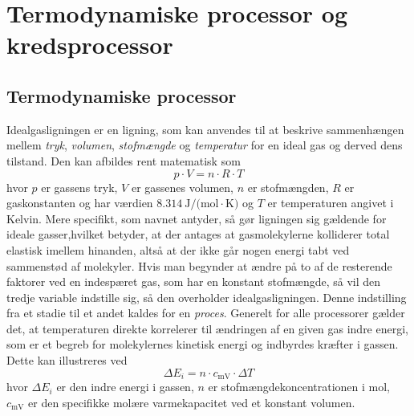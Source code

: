 \documentclass[12pt,a4paper]{article}
\author{Christian Kaae Larsen}
\begin{document}
	\tableofcontents
	\section{Termodynamiske processor og kredsprocessor}
		\subsection{Termodynamiske processor}
			Idealgasligningen er en ligning, som kan anvendes til at beskrive sammenhængen mellem
			\textit{tryk}, \textit{volumen}, \textit{stofmængde} og \textit{temperatur} for en ideal 
			gas og derved dens tilstand. Den kan afbildes rent matematisk som
			\begin{equation}
				p \cdot V = n \cdot R \cdot T
			\end{equation}
			hvor \(p\) er gassens tryk, \(V\) er gassenes volumen, \(n\) er stofmængden, \(R\) er gaskonstanten
			og har værdien \(\SI{8.314}{\joule\per (\mole\cdot\kelvin)} \) og \(T\) er temperaturen angivet i 
			Kelvin. Mere specifikt, som navnet antyder, så gør ligningen sig 
			gældende for ideale gasser,hvilket betyder, at der antages at gasmolekylerne kolliderer 
			total elastisk imellem hinanden, altså at der ikke går nogen energi tabt ved sammenstød af 
			molekyler. Hvis man begynder at ændre på to af de resterende faktorer ved en indespæret gas, 
			som har en konstant stofmængde, så vil den tredje variable indstille sig, så den overholder
			idealgasligningen. Denne indstilling fra et stadie til et andet kaldes for en \textit{proces}. 
			Generelt for alle processorer gælder det, at temperaturen direkte korrelerer til ændringen af 
			en given gas indre energi, som er et begreb for molekylernes kinetisk energi og indbyrdes 
			kræfter i gassen. Dette kan illustreres ved
			\begin{equation}
				\Delta E_i = n \cdot c_{\text{mV}} \cdot \Delta T
				\label{eq:2}
			\end{equation}
			hvor \(\Delta E_i\) er den indre energi i gassen, \(n\) er stofmængdekoncentrationen i mol, 
			\(c_{\text{mV}}\) er den specifikke molære varmekapacitet ved et konstant volumen. 
			
\end{document}
